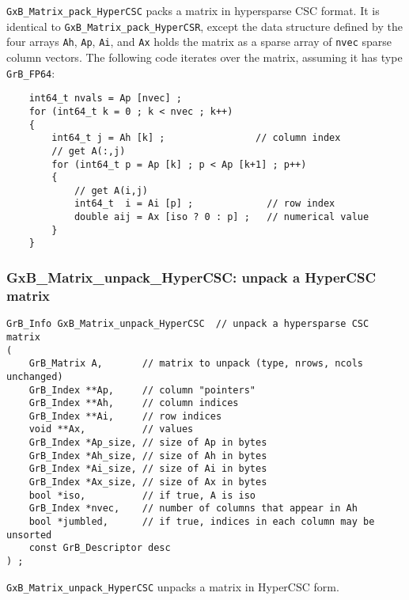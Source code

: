 \documentclass[12pt]{article}
\begin{document}
\verb'GxB_Matrix_pack_HyperCSC' packs a matrix in hypersparse CSC format.
It is identical to \verb'GxB_Matrix_pack_HyperCSR', except the data
structure defined by the four arrays \verb'Ah', \verb'Ap', \verb'Ai', and
\verb'Ax' holds the matrix as a sparse array of \verb'nvec' sparse column
vectors.  The following code iterates over the matrix,
assuming it has type \verb'GrB_FP64':

    \vspace{-0.10in}
    {\footnotesize
    \begin{verbatim}
    int64_t nvals = Ap [nvec] ;
    for (int64_t k = 0 ; k < nvec ; k++)
    {
        int64_t j = Ah [k] ;                // column index
        // get A(:,j)
        for (int64_t p = Ap [k] ; p < Ap [k+1] ; p++)
        {
            // get A(i,j)
            int64_t  i = Ai [p] ;             // row index
            double aij = Ax [iso ? 0 : p] ;   // numerical value
        }
    } \end{verbatim}}

\newpage
\subsubsection{{\sf GxB\_Matrix\_unpack\_HyperCSC:} unpack a HyperCSC matrix}
\label{matrix_unpack_hypercsc}

\begin{mdframed}[userdefinedwidth=6in]
{\footnotesize
\begin{verbatim}
GrB_Info GxB_Matrix_unpack_HyperCSC  // unpack a hypersparse CSC matrix
(
    GrB_Matrix A,       // matrix to unpack (type, nrows, ncols unchanged)
    GrB_Index **Ap,     // column "pointers"
    GrB_Index **Ah,     // column indices
    GrB_Index **Ai,     // row indices
    void **Ax,          // values
    GrB_Index *Ap_size, // size of Ap in bytes
    GrB_Index *Ah_size, // size of Ah in bytes
    GrB_Index *Ai_size, // size of Ai in bytes
    GrB_Index *Ax_size, // size of Ax in bytes
    bool *iso,          // if true, A is iso
    GrB_Index *nvec,    // number of columns that appear in Ah
    bool *jumbled,      // if true, indices in each column may be unsorted
    const GrB_Descriptor desc
) ;
\end{verbatim}
} \end{mdframed}

\verb'GxB_Matrix_unpack_HyperCSC' unpacks a matrix in HyperCSC form.
\end{document}
